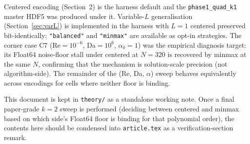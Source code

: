 \documentclass[11pt]{article}
\newcommand{\code}[1]{\texttt{#1}}
\begin{document}
Centered encoding (Section~2) is the harness default and the
\code{phase1\_quad\_k1} master HDF5 was produced under it. Variable-$L$
generalisation (Section~\ref{sec:varL}) is implemented in the harness
with $L = 1$ centered preserved bit-identically; \code{"balanced"} and
\code{"minmax"} are available as opt-in strategies. The corner case
C7 (Re$=10^{-6}$, Da$=10^{6}$, $\alpha_0=1$) was the empirical
diagnosis target: its Float64 noise-floor stall under centered at
$N=320$ is recovered by minmax at the same $N$, confirming that the
mechanism is solution-scale precision (not algorithm-side). The
remainder of the (Re, Da, $\alpha$) sweep behaves equivalently across
encodings for cells where neither floor is binding.

This document is kept in \texttt{theory/} as a standalone working
note. Once a final paper-grade $k=2$ sweep is performed (deciding
between centered and minmax based on which side's Float64 floor is
binding for that polynomial order), the contents here should be
condensed into \code{article.tex} as a verification-section remark.
\end{document}
